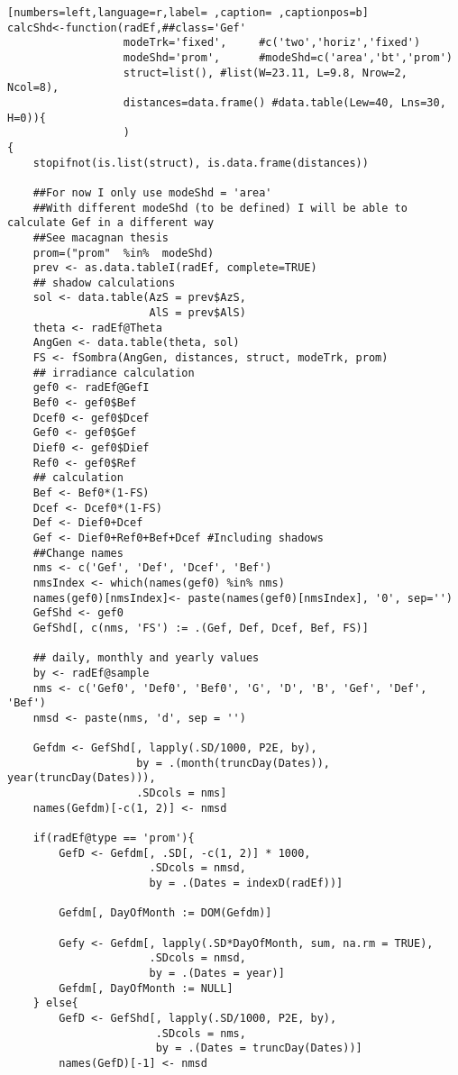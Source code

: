 \begin{lstlisting}[numbers=left,language=r,label= ,caption= ,captionpos=b]
calcShd<-function(radEf,##class='Gef'
                  modeTrk='fixed',     #c('two','horiz','fixed')
                  modeShd='prom',      #modeShd=c('area','bt','prom')
                  struct=list(), #list(W=23.11, L=9.8, Nrow=2, Ncol=8), 
                  distances=data.frame() #data.table(Lew=40, Lns=30, H=0)){
                  )
{
    stopifnot(is.list(struct), is.data.frame(distances))

    ##For now I only use modeShd = 'area'
    ##With different modeShd (to be defined) I will be able to calculate Gef in a different way
    ##See macagnan thesis
    prom=("prom"  %in%  modeShd)
    prev <- as.data.tableI(radEf, complete=TRUE)
    ## shadow calculations
    sol <- data.table(AzS = prev$AzS,
                      AlS = prev$AlS)
    theta <- radEf@Theta
    AngGen <- data.table(theta, sol)
    FS <- fSombra(AngGen, distances, struct, modeTrk, prom)
    ## irradiance calculation
    gef0 <- radEf@GefI
    Bef0 <- gef0$Bef
    Dcef0 <- gef0$Dcef
    Gef0 <- gef0$Gef
    Dief0 <- gef0$Dief
    Ref0 <- gef0$Ref
    ## calculation
    Bef <- Bef0*(1-FS)
    Dcef <- Dcef0*(1-FS)
    Def <- Dief0+Dcef
    Gef <- Dief0+Ref0+Bef+Dcef #Including shadows
    ##Change names
    nms <- c('Gef', 'Def', 'Dcef', 'Bef')
    nmsIndex <- which(names(gef0) %in% nms)
    names(gef0)[nmsIndex]<- paste(names(gef0)[nmsIndex], '0', sep='')
    GefShd <- gef0
    GefShd[, c(nms, 'FS') := .(Gef, Def, Dcef, Bef, FS)]

    ## daily, monthly and yearly values
    by <- radEf@sample
    nms <- c('Gef0', 'Def0', 'Bef0', 'G', 'D', 'B', 'Gef', 'Def', 'Bef')
    nmsd <- paste(nms, 'd', sep = '')

    Gefdm <- GefShd[, lapply(.SD/1000, P2E, by),
                    by = .(month(truncDay(Dates)), year(truncDay(Dates))),
                    .SDcols = nms]
    names(Gefdm)[-c(1, 2)] <- nmsd

    if(radEf@type == 'prom'){
        GefD <- Gefdm[, .SD[, -c(1, 2)] * 1000,
                      .SDcols = nmsd,
                      by = .(Dates = indexD(radEf))] 

        Gefdm[, DayOfMonth := DOM(Gefdm)]

        Gefy <- Gefdm[, lapply(.SD*DayOfMonth, sum, na.rm = TRUE),
                      .SDcols = nmsd,
                      by = .(Dates = year)]
        Gefdm[, DayOfMonth := NULL]
    } else{    
        GefD <- GefShd[, lapply(.SD/1000, P2E, by),
                       .SDcols = nms,
                       by = .(Dates = truncDay(Dates))]
        names(GefD)[-1] <- nmsd


\end{lstlisting}
